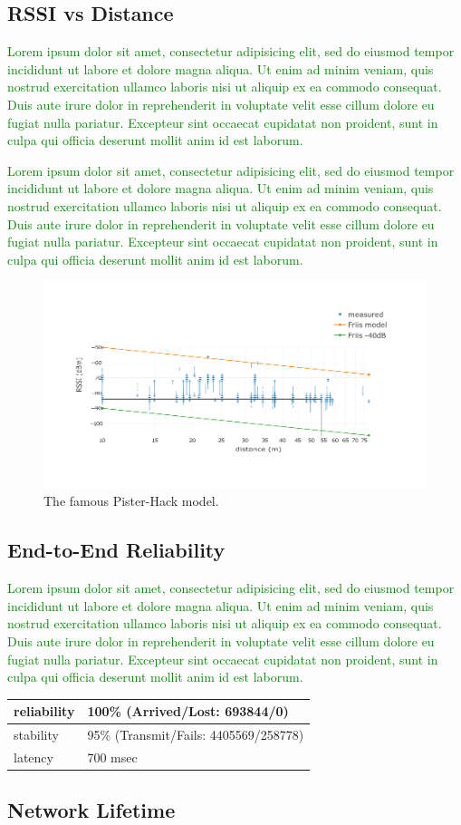 \documentclass{sig-alternate}
\newcommand{\lorem}          {\textcolor{green}{Lorem ipsum dolor sit amet, consectetur adipisicing elit, sed do eiusmod tempor incididunt ut labore et dolore magna aliqua. Ut enim ad minim veniam, quis nostrud exercitation ullamco laboris nisi ut aliquip ex ea commodo consequat. Duis aute irure dolor in reprehenderit in voluptate velit esse cillum dolore eu fugiat nulla pariatur. Excepteur sint occaecat cupidatat non proident, sunt in culpa qui officia deserunt mollit anim id est laborum.}}
\begin{document}
\subsection{RSSI vs Distance}
\label{sec:rssi_distance}

\lorem

\lorem

\begin{figure}
    \centering
    \includegraphics[width=\columnwidth]{pister_hack}
    \caption{The famous Pister-Hack model.}
    \label{fig:pister_hack}
\end{figure}

\subsection{End-to-End Reliability}
\label{sec:net_reliability}

\lorem

\begin{table}
    \begin{tabular}{|l|l|}
        \hline
        reliability & 100\% (Arrived/Lost:   693844/0)\\ \hline
        stability   & 95\% (Transmit/Fails: 4405569/258778)\\ \hline
        latency     & 700 msec\\
        \hline
    \end{tabular}
\end{table}

\subsection{Network Lifetime}
\label{sec:charge}
\end{document}
